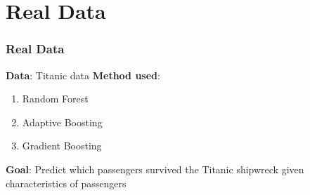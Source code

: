 \section{Real Data}

\begin{frame}[fragile] %
    \frametitle{Real Data}
    \textbf{Data}: Titanic data
\vspace{1ex}
    \newline \textbf{Method used}: 
\vspace{1ex}
    \begin{enumerate}
        \item Random Forest
        \item Adaptive Boosting 
        \item Gradient Boosting
    \end{enumerate}
\vspace{1ex}
    \textbf{Goal}: Predict which passengers survived the Titanic shipwreck given characteristics of passengers
\end{frame}
    


